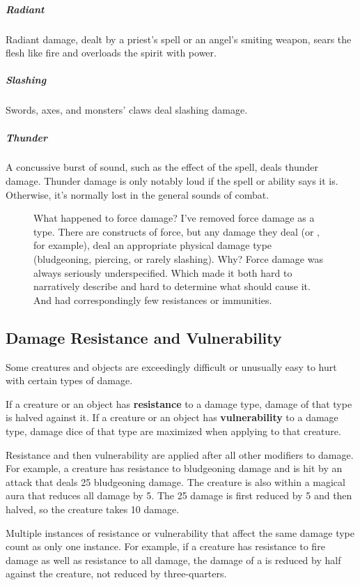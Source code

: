 \subparagraph*{Radiant} Radiant damage, dealt by a priest's  spell or an angel's smiting weapon, sears the flesh like fire and overloads the spirit with power.

\subparagraph*{Slashing} Swords, axes, and monsters' claws deal slashing damage.

\subparagraph*{Thunder} A concussive burst of sound, such as the effect of the  spell, deals thunder damage. Thunder damage is only notably loud if the spell or ability says it is. Otherwise, it's normally lost in the general sounds of combat.

\begin{figure}[htb]
    \begin{DndComment}{What happened to force damage?}
        I've removed force damage as a type. There are constructs of force, but any damage they deal (or , for example), deal an appropriate physical damage type (bludgeoning, piercing, or rarely slashing). Why? Force damage was always seriously underspecified. Which made it both hard to narratively describe and hard to determine what should cause it. And had correspondingly few resistances or immunities.
    \end{DndComment}
\end{figure}

\subsection{Damage Resistance and Vulnerability}

Some creatures and objects are exceedingly difficult or unusually easy to hurt with certain types of damage.

If a creature or an object has \textbf{resistance} to a damage type, damage of that type is halved against it. If a creature or an object has \textbf{vulnerability} to a damage type, damage dice of that type are maximized when applying to that creature.

Resistance and then vulnerability are applied after all other modifiers to damage. For example, a creature has resistance to bludgeoning damage and is hit by an attack that deals 25 bludgeoning damage. The creature is also within a magical aura that reduces all damage by 5. The 25 damage is first reduced by 5 and then halved, so the creature takes 10 damage.

Multiple instances of resistance or vulnerability that affect the same damage type count as only one instance. For example, if a creature has resistance to fire damage as well as resistance to all damage, the damage of a  is reduced by half against the creature, not reduced by three-quarters.


